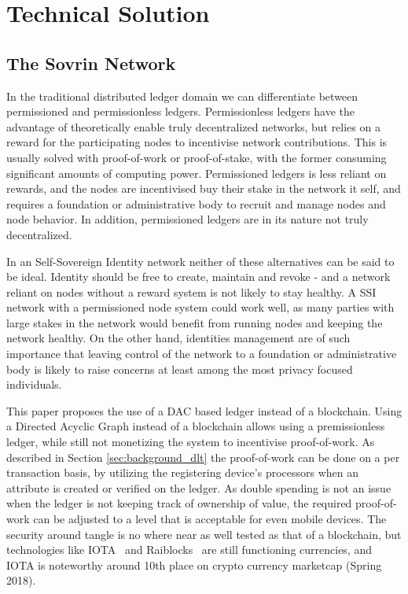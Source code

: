 \chapter{Technical Solution}
\label{chap:solution}

\section{The Sovrin Network}

In the traditional distributed ledger domain we can differentiate between permissioned and permissionless ledgers. Permissionless ledgers have the advantage of theoretically enable truly decentralized networks, but relies on a reward for the participating nodes to incentivise network contributions. This is usually solved with proof-of-work or proof-of-stake, with the former consuming significant amounts of computing power. Permissioned ledgers is less  reliant on rewards, and the nodes are incentivised buy their stake in the network it self, and requires a foundation or administrative body to recruit and manage nodes and node behavior. In addition, permissioned ledgers are in its nature not truly decentralized.

In an Self-Sovereign Identity network neither of these alternatives can be said to be ideal. Identity should be free to create, maintain and revoke - and a network reliant on nodes without a reward system is not likely to stay healthy. A SSI network with a permissioned node system could work well, as many parties with large stakes in the network would benefit from running nodes and keeping the network healthy. On the other hand, identities management are of such importance that leaving control of the network to a foundation or administrative body is likely to raise concerns at least among the most privacy focused individuals.

This paper proposes the use of a DAC based ledger instead of a blockchain. Using a Directed Acyclic Graph instead of a blockchain allows using a premissionless ledger, while still not monetizing the system to incentivise proof-of-work. As described in Section \ref{sec:background_dlt} the proof-of-work can be done on a per transaction basis, by utilizing the registering device's processors when an attribute is created or verified on the ledger. As double spending is not an issue when the ledger is not keeping track of ownership of value, the required proof-of-work can be adjusted to a level that is acceptable for even mobile devices. The security around tangle is no where near as well tested as that of a blockchain, but technologies like IOTA~\cite{IOTA_Whitepaper} and Raiblocks~\cite{Raiblocks_Whitepaper} are still functioning currencies, and IOTA is noteworthy around 10th place on crypto currency marketcap (Spring 2018).


